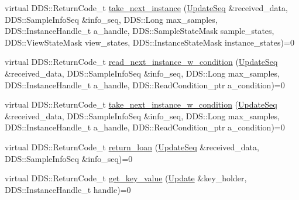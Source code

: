 \begin{DoxyCompactItemize}
\item 
virtual DDS::ReturnCode\_\-t \hyperlink{classKnowledge_1_1UpdateDataReaderView_af1c67955ccdcd77b3ae33b6f353a5c95}{take\_\-next\_\-instance} (\hyperlink{namespaceKnowledge_ab62e46316b954f0d249e0e45de7059dc}{UpdateSeq} \&received\_\-data, DDS::SampleInfoSeq \&info\_\-seq, DDS::Long max\_\-samples, DDS::InstanceHandle\_\-t a\_\-handle, DDS::SampleStateMask sample\_\-states, DDS::ViewStateMask view\_\-states, DDS::InstanceStateMask instance\_\-states)=0
\item 
virtual DDS::ReturnCode\_\-t \hyperlink{classKnowledge_1_1UpdateDataReaderView_a5d83f32fa162f638c17854fe3bf63f33}{read\_\-next\_\-instance\_\-w\_\-condition} (\hyperlink{namespaceKnowledge_ab62e46316b954f0d249e0e45de7059dc}{UpdateSeq} \&received\_\-data, DDS::SampleInfoSeq \&info\_\-seq, DDS::Long max\_\-samples, DDS::InstanceHandle\_\-t a\_\-handle, DDS::ReadCondition\_\-ptr a\_\-condition)=0
\item 
virtual DDS::ReturnCode\_\-t \hyperlink{classKnowledge_1_1UpdateDataReaderView_a32ed3ea4770380d8c80dc3c50b62f12c}{take\_\-next\_\-instance\_\-w\_\-condition} (\hyperlink{namespaceKnowledge_ab62e46316b954f0d249e0e45de7059dc}{UpdateSeq} \&received\_\-data, DDS::SampleInfoSeq \&info\_\-seq, DDS::Long max\_\-samples, DDS::InstanceHandle\_\-t a\_\-handle, DDS::ReadCondition\_\-ptr a\_\-condition)=0
\item 
virtual DDS::ReturnCode\_\-t \hyperlink{classKnowledge_1_1UpdateDataReaderView_a1b79441f3f23a20281762c217f1a9c41}{return\_\-loan} (\hyperlink{namespaceKnowledge_ab62e46316b954f0d249e0e45de7059dc}{UpdateSeq} \&received\_\-data, DDS::SampleInfoSeq \&info\_\-seq)=0
\item 
virtual DDS::ReturnCode\_\-t \hyperlink{classKnowledge_1_1UpdateDataReaderView_ad573a746c07295f3e9eb197ccecdd00f}{get\_\-key\_\-value} (\hyperlink{structKnowledge_1_1Update}{Update} \&key\_\-holder, DDS::InstanceHandle\_\-t handle)=0
\end{DoxyCompactItemize}
